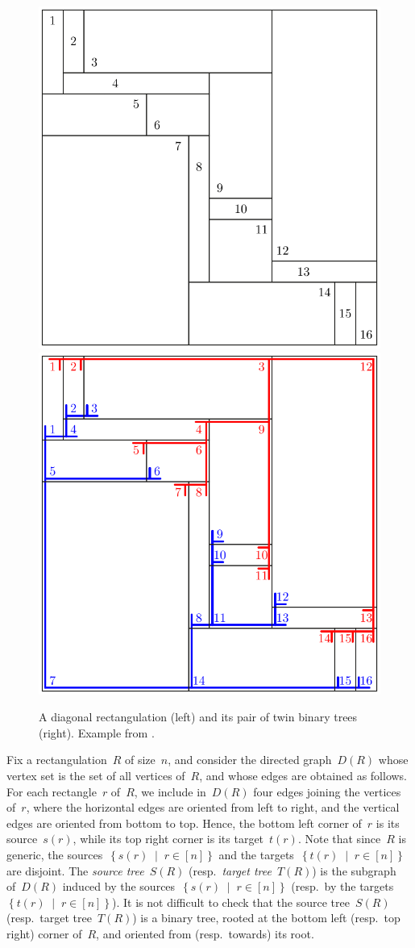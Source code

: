 \documentclass{amsart}
\theoremstyle{definition}
\newcommand{\set}[2]{\left\{ #1 \;\middle|\; #2 \right\}} %
\newcommand{\darkblue}{\color{darkblue}} %
\newcommand{\defn}[1]{\textsl{\darkblue #1}} %
\begin{document}
\begin{figure}
	\centerline{\includegraphics[width=.5\textwidth]{weakRectangulation} \qquad \includegraphics[width=.5\textwidth]{weakRectangulationTrees}}
	\caption{A diagonal rectangulation (left) and its pair of twin binary trees (right). Example from \cite{ACFF24}.}
	\label{fig:weakRectangulation}
\end{figure}

Fix a rectangulation~$R$ of size~$n$, and consider the directed graph~$D(R)$ whose vertex set is the set of all vertices of~$R$, and whose edges are obtained as follows.
For each rectangle~$r$ of~$R$, we include in~$D(R)$ four edges joining the vertices of~$r$, where the horizontal edges are oriented from left to right, and the vertical edges are oriented from bottom to top.
Hence, the bottom left corner of~$r$ is its source~$s(r)$, while its top right corner is its target~$t(r)$.
Note that since~$R$ is generic, the sources~$\set{s(r)}{r \in [n]}$ and the targets~$\set{t(r)}{r \in [n]}$ are disjoint.
The \defn{source tree}~$S(R)$ (resp.~\defn{target tree}~$T(R)$) is the subgraph of~$D(R)$ induced by the sources~$\set{s(r)}{r \in [n]}$ (resp.~by the targets~$\set{t(r)}{r \in [n]}$).
It is not difficult to check that the source tree~$S(R)$ (resp.~target tree~$T(R)$) is a binary tree, rooted at the bottom left (resp.~top right) corner of~$R$, and oriented from (resp.~towards) its root.
\end{document}
